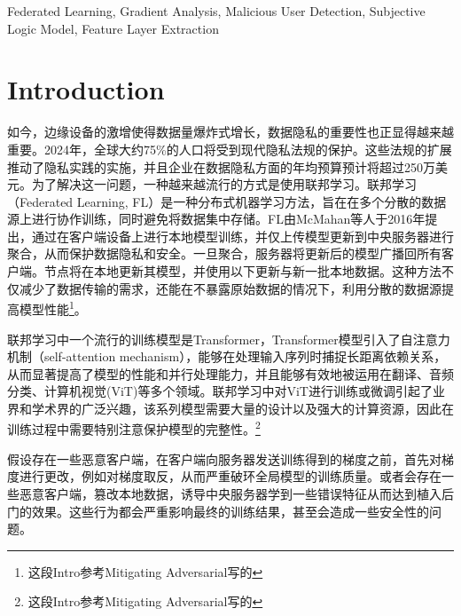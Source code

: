 \documentclass[conference]{IEEEtran}
\begin{document}
\begin{IEEEkeywords}

Federated Learning, Gradient Analysis, Malicious User Detection, Subjective Logic Model, Feature Layer Extraction
\end{IEEEkeywords}

\section{Introduction}

\label{sec:intro}



如今，边缘设备的激增使得数据量爆炸式增长\cite{edgeComputing_explosiveGrowth}，数据隐私的重要性也正显得越来越重要。2024年，全球大约75\%的人口将受到现代隐私法规的保护。这些法规的扩展推动了隐私实践的实施，并且企业在数据隐私方面的年均预算预计将超过250万美元\cite{dataPrivacyIsEncreasing}。为了解决这一问题，一种越来越流行的方式是使用联邦学习\cite{useFL2solve}。联邦学习（Federated Learning, FL）是一种分布式机器学习方法，旨在在多个分散的数据源上进行协作训练，同时避免将数据集中存储。FL由McMahan等人于2016年提出，通过在客户端设备上进行本地模型训练，并仅上传模型更新到中央服务器进行聚合，从而保护数据隐私和安全。一旦聚合，服务器将更新后的模型广播回所有客户端。节点将在本地更新其模型，并使用以下更新与新一批本地数据。这种方法不仅减少了数据传输的需求，还能在不暴露原始数据的情况下，利用分散的数据源提高模型性能\cite{FLGenesisArticle}\footnote{这段Intro参考Mitigating Adversarial写的}。

联邦学习中一个流行的训练模型是Transformer\cite{transformer}，Transformer模型引入了自注意力机制（self-attention mechanism），能够在处理输入序列时捕捉长距离依赖关系，从而显著提高了模型的性能和并行处理能力，并且能够有效地被运用在翻译\cite{transformer_translation}、音频分类\cite{transformer_audioClassification}、计算机视觉(ViT)\cite{transformer_vision}等多个领域。联邦学习中对ViT进行训练或微调引起了业界和学术界的广泛兴趣\cite{transformer_gotInterest}，该系列模型需要大量的设计以及强大的计算资源，因此在训练过程中需要特别注意保护模型的完整性。\footnote{这段Intro参考Mitigating Adversarial写的}

假设存在一些恶意客户端，在客户端向服务器发送训练得到的梯度之前，首先对梯度进行更改，例如对梯度取反，从而严重破环全局模型的训练质量。或者会存在一些恶意客户端，篡改本地数据，诱导中央服务器学到一些错误特征从而达到植入后门的效果。这些行为都会严重影响最终的训练结果，甚至会造成一些安全性的问题。
\end{document}
